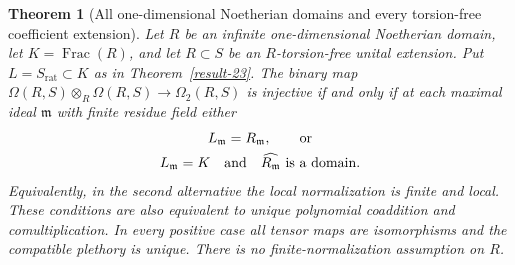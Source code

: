 \documentclass[11pt,a4paper]{article}
\newtheorem{theorem}{Theorem}[section]
\theoremstyle{definition}
\begin{document}
\begin{theorem}[All one-dimensional Noetherian domains and every torsion-free coefficient extension]\label{result-37}
Let $R$ be an infinite one-dimensional Noetherian domain,
let $K=\operatorname{Frac}(R)$, and let $R\subset S$
be an $R$-torsion-free unital extension. Put
$L=S_{\mathrm{rat}}\subset K$ as in Theorem~\ref{result-23}.
The binary map
$\Omega(R,S)\otimes_R\Omega(R,S)\to\Omega_2(R,S)$ is
injective if and only if at each maximal ideal $\mathfrak m$
with finite residue field either
\begin{equation}
 \begin{gathered}
 L_{\mathfrak m}=R_{\mathfrak m},\qquad\hbox{or}\\
 L_{\mathfrak m}=K\quad\hbox{and}\quad
 \widehat{R_{\mathfrak m}}\hbox{ is a domain}.
 \end{gathered}                                            \label{equation-77}
\end{equation}
Equivalently, in the second alternative the local
normalization is finite and local. These conditions are also
equivalent to unique polynomial coaddition and comultiplication.
In every positive case all tensor maps are isomorphisms and the
compatible plethory is unique. There is no
finite-normalization assumption on $R$.
\end{theorem}
\end{document}
